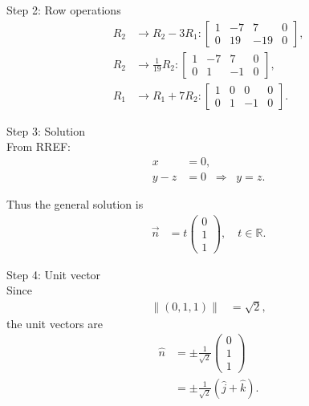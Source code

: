 \documentclass{beamer}
\begin{document}
\begin{frame}
    

Step 2: Row operations\\
\begin{align}
R_2 &\to R_2 - 3R_1: 
\left[\begin{array}{ccc|c}
1 & -7 & 7 & 0\\
0 & 19 & -19 & 0
\end{array}\right], \label{eq:row1}\\[6pt]
R_2 &\to \tfrac{1}{19}R_2: 
\left[\begin{array}{ccc|c}
1 & -7 & 7 & 0\\
0 & 1 & -1 & 0
\end{array}\right], \label{eq:row2}\\[6pt]
R_1 &\to R_1 + 7R_2: 
\left[\begin{array}{ccc|c}
1 & 0 & 0 & 0\\
0 & 1 & -1 & 0
\end{array}\right]. \label{eq:row3}
\end{align}

Step 3: Solution\\
From RREF:
\begin{align}
x &= 0, \label{eq:x0}\\
y - z &= 0 \;\;\Rightarrow\;\; y=z. \label{eq:yz}
\end{align}
\end{frame}
\begin{frame}
Thus the general solution is
\begin{align}
\vec{n} &= t\begin{pmatrix}0\\1\\1\end{pmatrix}, \quad t\in\mathbb{R}. \label{eq:gensol}
\end{align}

Step 4: Unit vector\\
Since 
\begin{align}
\|(0,1,1)\| &= \sqrt{2}, \label{eq:norm}
\end{align}
the unit vectors are
\begin{align}
\hat{n} &= \pm \frac{1}{\sqrt{2}}\begin{pmatrix}0\\1\\1\end{pmatrix} \label{eq:unit1}\\
&= \pm \frac{1}{\sqrt{2}}(\hat{j}+\hat{k}). \label{eq:unit2}
\end{align}


\end{frame}
\end{document}
